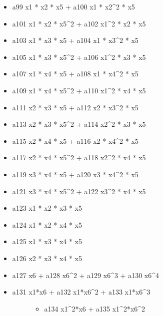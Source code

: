 \documentclass[letterpaper,10pt,english]{sphinxmanual}
\begin{document}
\begin{fulllineitems}
\begin{description}
\begin{itemize}
\item {} 
a99  x1 * x2 * x5 + a100 x1 * x2\textasciicircum{}2 * x5

\item {} 
a101 x1 * x2 * x5\textasciicircum{}2 + a102 x1\textasciicircum{}2 * x2 * x5

\item {} 
a103 x1 * x3 * x5 + a104 x1 * x3\textasciicircum{}2 * x5

\item {} 
a105 x1 * x3 * x5\textasciicircum{}2 + a106 x1\textasciicircum{}2 * x3 * x5

\item {} 
a107 x1 * x4 * x5 + a108 x1 * x4\textasciicircum{}2 * x5

\item {} 
a109 x1 * x4 * x5\textasciicircum{}2 + a110 x1\textasciicircum{}2 * x4 * x5

\item {} 
a111 x2 * x3 * x5 + a112 x2 * x3\textasciicircum{}2 * x5

\item {} 
a113 x2 * x3 * x5\textasciicircum{}2 + a114 x2\textasciicircum{}2 * x3 * x5

\item {} 
a115 x2 * x4 * x5 + a116 x2 * x4\textasciicircum{}2 * x5

\item {} 
a117 x2 * x4 * x5\textasciicircum{}2 + a118 x2\textasciicircum{}2 * x4 * x5

\item {} 
a119 x3 * x4 * x5 + a120 x3 * x4\textasciicircum{}2 * x5

\item {} 
a121 x3 * x4 * x5\textasciicircum{}2 + a122 x3\textasciicircum{}2 * x4 * x5

\item {} 
a123 x1 * x2 * x3 * x5

\item {} 
a124 x1 * x2 * x4 * x5

\item {} 
a125 x1 * x3 * x4 * x5

\item {} 
a126 x2 * x3 * x4 * x5

\item {} 
a127 x6 + a128 x6\textasciicircum{}2 + a129 x6\textasciicircum{}3 + a130 x6\textasciicircum{}4

\item {} \begin{description}
\item[{a131 x1*x6 + a132 x1*x6\textasciicircum{}2 + a133 x1*x6\textasciicircum{}3}] \leavevmode\begin{itemize}
\item {} 
a134 x1\textasciicircum{}2*x6 + a135 x1\textasciicircum{}2*x6\textasciicircum{}2


\end{itemize}
\end{description}
\end{itemize}
\end{description}
\end{fulllineitems}
\end{document}
